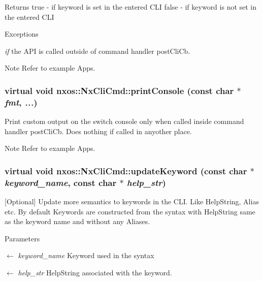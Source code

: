 \begin{DoxyReturn}{Returns}
true -\/ if keyword is set in the entered CLI false -\/ if keyword is not set in the entered CLI
\end{DoxyReturn}

\begin{DoxyExceptions}{Exceptions}
\item[{\em if}]the API is called outside of command handler postCliCb. \end{DoxyExceptions}
\begin{DoxyNote}{Note}
Refer to example Apps. 
\end{DoxyNote}
\hypertarget{classnxos_1_1NxCliCmd_a10c723c79d75ac2c85821b5ca6540c62}{
\subsubsection[{printConsole}]{\setlength{\rightskip}{0pt plus 5cm}virtual void nxos::NxCliCmd::printConsole (const char $\ast$ {\em fmt}, \/   {\em ...})}}
\label{classnxos_1_1NxCliCmd_a10c723c79d75ac2c85821b5ca6540c62}
Print custom output on the switch console only when called inside command handler postCliCb. Does nothing if called in anyother place.

\begin{DoxyNote}{Note}
Refer to example Apps. 
\end{DoxyNote}
\hypertarget{classnxos_1_1NxCliCmd_aa698fdd1026739307e0710e2948f19f5}{
\subsubsection[{updateKeyword}]{\setlength{\rightskip}{0pt plus 5cm}virtual void nxos::NxCliCmd::updateKeyword (const char $\ast$ {\em keyword\_\-name}, \/  const char $\ast$ {\em help\_\-str})}}
\label{classnxos_1_1NxCliCmd_aa698fdd1026739307e0710e2948f19f5}
\mbox{[}Optional\mbox{]} Update more semantics to keywords in the CLI. Like HelpString, Alias etc. By default Keywords are constructed from the syntax with HelpString same as the keyword name and without any Aliases. 
\begin{DoxyParams}{Parameters}
\item[\mbox{$\leftarrow$} {\em keyword\_\-name}]Keyword used in the syntax \item[\mbox{$\leftarrow$} {\em help\_\-str}]HelpString associated with the keyword.\end{DoxyParams}

